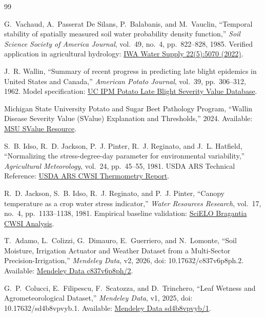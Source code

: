\documentclass[10pt,twocolumn,a4paper]{article}
\begin{document}
\balance
\begin{thebibliography}{99}\footnotesize\setlength{\itemsep}{1.5pt plus 0.5pt}

G.~Vachaud, A.~Passerat De Silans, P.~Balabanis, and M.~Vauclin, ``Temporal stability of spatially measured soil water probability density function,'' \textit{Soil Science Society of America Journal}, vol.~49, no.~4, pp.~822--828, 1985. Verified application in agricultural hydrology: \href{https://iwaponline.com/ws/article/22/5/5070/88251/Temporal-stability-of-soil-water-content-in}{IWA Water Supply 22(5):5070 (2022)}.

J.~R. Wallin, ``Summary of recent progress in predicting late blight epidemics in United States and Canada,'' \textit{American Potato Journal}, vol.~39, pp.~306--312, 1962. Model specification: \href{https://ipm.ucanr.edu/DISEASE/DATABASE/potatolateblight.html}{UC IPM Potato Late Blight Severity Value Database}.

Michigan State University Potato and Sugar Beet Pathology Program, ``Wallin Disease Severity Value (SValue) Explanation and Thresholds,'' 2024. Available: \href{https://www.canr.msu.edu/psbp/resources/svalue}{MSU SValue Resource}.

S.~B. Idso, R.~D. Jackson, P.~J. Pinter, R.~J. Reginato, and J.~L. Hatfield, ``Normalizing the stress-degree-day parameter for environmental variability,'' \textit{Agricultural Meteorology}, vol.~24, pp.~45--55, 1981. USDA ARS Technical Reference: \href{https://www.ars.usda.gov/ARSUserFiles/30100000/1990-1999documents/266%201992%20GardnerJPA.pdf}{USDA ARS CWSI Thermometry Report}.

R.~D. Jackson, S.~B. Idso, R.~J. Reginato, and P.~J. Pinter, ``Canopy temperature as a crop water stress indicator,'' \textit{Water Resources Research}, vol.~17, no.~4, pp.~1133--1138, 1981. Empirical baseline validation: \href{https://www.scielo.br/j/brag/a/hVG7cZ4md6HyXfzNVsLyxtQ/?lang=en}{SciELO Bragantia CWSI Analysis}.

T.~Adamo, L.~Colizzi, G.~Dimauro, E.~Guerriero, and N.~Lomonte, ``Soil Moisture, Irrigation Actuator and Weather Dataset from a Multi-Sector Precision-Irrigation,'' \textit{Mendeley Data}, v2, 2026, doi: 10.17632/c837v6p8ph.2. Available: \href{https://data.mendeley.com/datasets/c837v6p8ph/2}{Mendeley Data c837v6p8ph/2}.

G.~P.~Colucci, E.~Filipescu, F.~Scatozza, and D.~Trinchero, ``Leaf Wetness and Agrometeorological Dataset,'' \textit{Mendeley Data}, v1, 2025, doi: 10.17632/sd4b8vpvyb.1. Available: \href{https://data.mendeley.com/datasets/sd4b8vpvyb/1}{Mendeley Data sd4b8vpvyb/1}.


\end{thebibliography}
\end{document}
